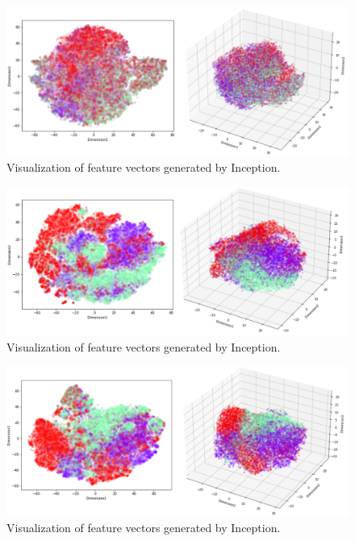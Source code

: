 \begin{figure}[H]
    \centering
    \includegraphics[width=1\columnwidth]{body/figure/figure17.png}
    \captionsetup{labelfont=bf}
    \renewcommand{\baselinestretch}{1.0}
    \caption[Visualization of feature vectors generated by Inception]{Visualization of feature vectors generated by Inception.}
    \label{f17}
\end{figure}

\begin{figure}[H]
    \centering
    \includegraphics[width=1\columnwidth]{body/figure/figure18.png}
    \captionsetup{labelfont=bf}
    \renewcommand{\baselinestretch}{1.0}
    \caption[Visualization of feature vectors generated by Inception]{Visualization of feature vectors generated by Inception.}
    \label{f18}
\end{figure}

\begin{figure}[H]
    \centering
    \includegraphics[width=1\columnwidth]{body/figure/figure19.png}
    \captionsetup{labelfont=bf}
    \renewcommand{\baselinestretch}{1.0}
    \caption[Visualization of feature vectors generated by Inception]{Visualization of feature vectors generated by Inception.}
    \label{f19}
\end{figure}

